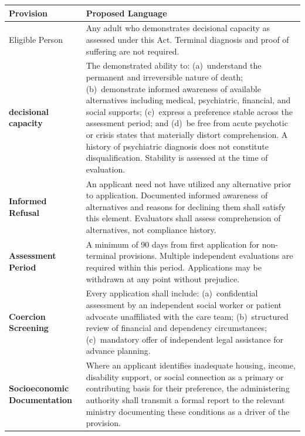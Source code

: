 \documentclass[11pt, letterpaper]{article}
\begin{document}
\begin{longtable}{>{\bfseries\sffamily\small}p{3cm} p{10.5cm}}
\toprule
\textbf{\sffamily Provision} & \textbf{\sffamily Proposed Language} \\
\midrule
\endhead
\bottomrule
\endfoot

Eligible Person
  & Any adult who demonstrates decisional capacity as assessed under this Act.
    Terminal diagnosis and proof of suffering are not required. \\[6pt]

decisional capacity
  & The demonstrated ability to: (a)~understand the permanent and irreversible nature
    of death; (b)~demonstrate informed awareness of available alternatives including
    medical, psychiatric, financial, and social supports; (c)~express a preference
    stable across the assessment period; and (d)~be free from acute psychotic or
    crisis states that materially distort comprehension.
    A history of psychiatric diagnosis does not constitute disqualification.
    Stability is assessed at the time of evaluation. \\[6pt]

Informed Refusal
  & An applicant need not have utilized any alternative prior to application.
    Documented informed awareness of alternatives and reasons for declining
    them shall satisfy this element. Evaluators shall assess comprehension
    of alternatives, not compliance history. \\[6pt]

Assessment Period
  & A minimum of 90 days from first application for non-terminal provisions.
    Multiple independent evaluations are required within this period.
    Applications may be withdrawn at any point without prejudice. \\[6pt]

Coercion Screening
  & Every application shall include: (a)~confidential assessment by an
    independent social worker or patient advocate unaffiliated with the
    care team; (b)~structured review of financial and dependency
    circumstances; (c)~mandatory offer of independent legal assistance
    for advance planning. \\[6pt]

Socioeconomic Documentation
  & Where an applicant identifies inadequate housing, income, disability
    support, or social connection as a primary or contributing basis for
    their preference, the administering authority shall transmit a formal
    report to the relevant ministry documenting these conditions as a
    driver of the provision. \\[6pt]


\end{longtable}
\end{document}
